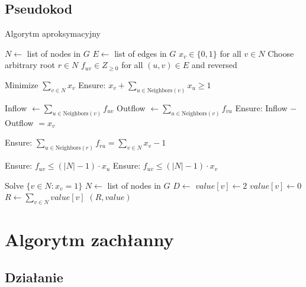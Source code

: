 \subsection{Pseudokod}
\begin{algorithm}[H]
    \caption*{Algorytm aproksymacyjny}
    \begin{algorithmic}[1]
        \State $N \gets$ list of nodes in $G$
        \State $E \gets$ list of edges in $G$
        \State $x_v \in \{0,1\}$ for all $v \in N$
        \State Choose arbitrary root $r \in N$
        \State $f_{uv} \in {Z}_{\geq 0}$ for all $(u,v) \in E$ and reversed
    
        \State Minimize $\sum_{v \in N} x_v$
            \State Ensure: $x_v + \sum_{u \in \text{Neighbors}(v)} x_u \geq 1$ 
        \EndFor
    
            \State Inflow $\gets \sum_{u \in \text{Neighbors}(v)} f_{uv}$
            \State Outflow $\gets \sum_{u \in \text{Neighbors}(v)} f_{vu}$
            \State Ensure: Inflow $-$ Outflow $= x_v$ 
        \EndFor
    
        \State Ensure: $\sum_{u \in \text{Neighbors}(r)} f_{ru} = \sum_{v \in N} x_v - 1$ 
    
            \State Ensure: $f_{uv} \leq (|N|-1) \cdot x_u$
            \State Ensure: $f_{uv} \leq (|N|-1) \cdot x_v$ 
        \EndFor
    
        \State Solve
        \State \Return $\{v \in N : x_v = 1\}$
    \EndFunction
        \State $N \gets$ list of nodes in $G$
        \State $D \gets$ 
                \State $value[v] \gets 2$
            \Else
                \State $value[v] \gets 0$
            \EndIf
        \EndFor
        \State $R \gets \sum_{v \in N} value[v]$
        \State \Return $(R, value)$
    \EndFunction
    \end{algorithmic}
    \end{algorithm}

    \section{Algorytm zachłanny}
    \subsection{Działanie}
    
